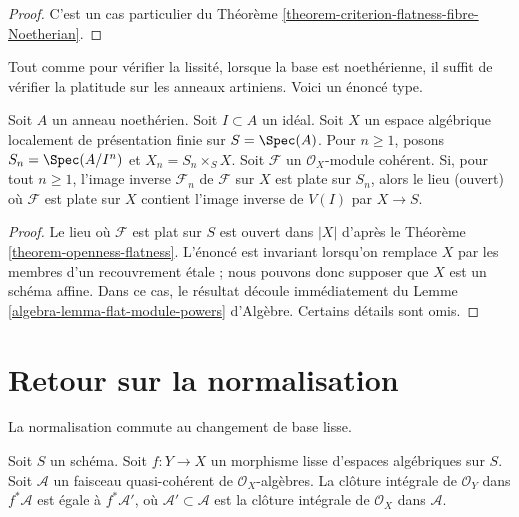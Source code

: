 \begin{proof}
C'est un cas particulier du
Théorème \ref{theorem-criterion-flatness-fibre-Noetherian}.
\end{proof}

\noindent
Tout comme pour vérifier la lissité, lorsque la base est noethérienne, il suffit
de vérifier la platitude sur les anneaux artiniens. Voici un énoncé type.

\begin{lemma}
\label{lemma-flatness-over-Noetherian-ring}
Soit $A$ un anneau noethérien. Soit $I \subset A$ un idéal.
Soit $X$ un espace algébrique localement de présentation finie sur
$S = \Spec(A)$. Pour $n \geq 1$, posons $S_n = \Spec(A/I^n)$ et
$X_n = S_n \times_S X$. Soit $\mathcal{F}$ un $\mathcal{O}_X$-module cohérent.
Si, pour tout $n \geq 1$, l'image inverse $\mathcal{F}_n$ de $\mathcal{F}$ sur $X$
est plate sur $S_n$, alors le lieu (ouvert) où $\mathcal{F}$
est plate sur $X$ contient l'image inverse de $V(I)$ par $X \to S$.
\end{lemma}

\begin{proof}
Le lieu où $\mathcal{F}$ est plat sur $S$ est ouvert dans $|X|$ d'après le
Théorème \ref{theorem-openness-flatness}.
L'énoncé est invariant lorsqu'on remplace $X$ par les membres d'un
recouvrement étale ; nous pouvons donc supposer que $X$ est un schéma affine.
Dans ce cas, le résultat découle immédiatement du
Lemme \ref{algebra-lemma-flat-module-powers} d'Algèbre.
Certains détails sont omis.
\end{proof}







\section{Retour sur la normalisation}
\label{section-normalization}

\noindent
La normalisation commute au changement de base lisse.

\begin{lemma}
\label{lemma-integral-closure-smooth-pullback}
Soit $S$ un schéma. Soit $f : Y \to X$ un morphisme lisse
d'espaces algébriques sur $S$. Soit $\mathcal{A}$ un faisceau quasi-cohérent
de $\mathcal{O}_X$-algèbres. La clôture intégrale
de $\mathcal{O}_Y$ dans $f^*\mathcal{A}$ est égale à $f^*\mathcal{A}'$,
où $\mathcal{A}' \subset \mathcal{A}$ est la clôture intégrale de
$\mathcal{O}_X$ dans $\mathcal{A}$.
\end{lemma}

